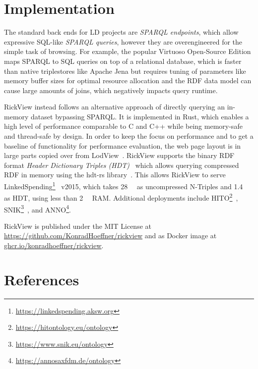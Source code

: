 \documentclass[a4paper,10pt]{article}
\begin{document}
\section{Implementation}\label{implementation}

The standard back ends for LD projects are \emph{SPARQL endpoints}, which allow expressive SQL-like \emph{SPARQL queries}, however they are overengineered for the simple task of browsing.
For example, the popular Virtuoso Open-Source Edition maps SPARQL to SQL queries on top of a relational database, which is faster than native triplestores like Apache Jena but requires tuning of parameters like memory buffer sizes for optimal resource allocation and the RDF data model can cause large amounts of joins, which negatively impacts query runtime.

RickView instead follows an alternative approach of directly querying an in-memory dataset bypassing SPARQL.
It is implemented in Rust, which enables a high level of performance comparable to C and C++ while being memory-safe and thread-safe by design.
In order to keep the focus on performance and to get a baseline of functionality for performance evaluation, the web page layout is in large parts copied
over from LodView~\citep{lodview,adaptinglodview}.
%
RickView supports the binary RDF format \emph{Header Dictionary Triples (HDT)}~\citep{hdt2012} which allows querying compressed RDF in memory using the hdt-rs library~\citep{hdtrs}.
This allows RickView to serve LinkedSpending\footnote{\url{https://linkedspending.aksw.org}}~\citep{linkedspending} v2015, which takes \SI{28}{\giga\byte} as uncompressed N-Triples and \SI{1.4}{\giga\byte} as HDT, using less than \SI{2}{\giga\byte} RAM.
%
Additional deployments include HITO\footnote{\url{https://hitontology.eu/ontology}}~\citep{hito}, SNIK\footnote{\url{https://www.snik.eu/ontology}}~\citep{snik},
 and ANNO\footnote{\url{https://annosaxfdm.de/ontology}}.

RickView is published under the MIT License at \url{https://github.com/KonradHoeffner/rickview} and as Docker image at \url{ghcr.io/konradhoeffner/rickview}.

\section{References}\label{references}



\end{document}
